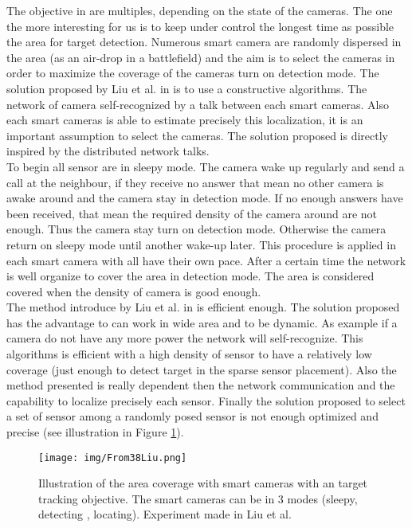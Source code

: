 The objective in \cite{38*liu2010} are multiples, depending on the state of the cameras. The one the more interesting for us is to keep under control the longest time as possible the area for target detection. Numerous smart camera are randomly dispersed in the area (as an air-drop in a battlefield) and the aim is to select the cameras in order to maximize the coverage of the cameras turn on detection mode. The solution proposed by Liu et al. in \cite{38*liu2010} is to use a constructive algorithms. The network of camera self-recognized by a talk between each smart cameras. Also each smart cameras is able to estimate precisely this localization, it is an important assumption to select the cameras. The solution proposed is directly inspired by the distributed network talks. \\
To begin all sensor are in sleepy mode. The camera wake up regularly and send a call at the neighbour, if they receive no answer that mean no other camera is awake around and the camera stay in detection mode. If no enough answers have been received, that mean the required density of the camera around are not enough. Thus the camera stay turn on detection mode. Otherwise the camera return on sleepy mode until another wake-up later. This procedure is applied in each smart camera with all have their own pace. After a certain time the network is well organize to cover the area in detection mode. The area is considered covered when the density of camera is good enough. \\
 The method introduce by Liu et al. in \cite{38*liu2010} is efficient enough. The solution proposed has the advantage to can work in wide area and to be dynamic. As example if a camera do not have any more power the network will self-recognize.  
This algorithms is efficient with a high density of sensor to have a relatively low coverage (just enough to detect target in the sparse sensor placement). Also the method presented is really dependent then the network communication and the capability to localize precisely each sensor. Finally the solution proposed to select a set of sensor among a randomly posed sensor is not enough optimized and precise (see illustration in Figure \ref{fig:Coverage38}). \\
	\begin{figure}[t!]
	\center
{}
   \texttt{[image: img/From38Liu.png]}
  \caption{Illustration of  the  area coverage with smart cameras with an target tracking objective. The smart cameras can be in 3 modes (sleepy, detecting , locating). Experiment made in Liu et al. \citep{38*liu2010}}\label{fig:Coverage38}
  \endminipage\hfill
\end{figure} 

